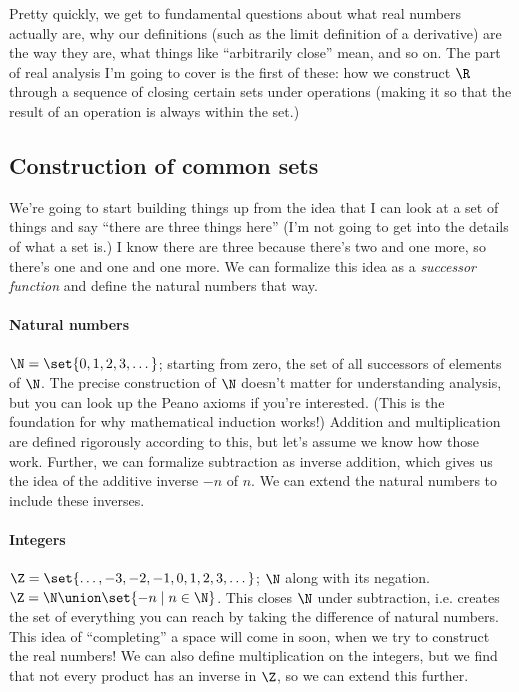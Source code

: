 \documentclass[./analysis.tex]{subfiles}
\begin{document}
    Pretty quickly, we get to fundamental questions about what real numbers actually are, why our definitions (such as the limit definition of a derivative) are the way they are, what things like ``arbitrarily close'' mean, and so on. The part of real analysis I'm going to cover is the first of these: how we construct $\R$ through a sequence of closing certain sets under operations (making it so that the result of an operation is always within the set.)

    \subsection{Construction of common sets}

    We're going to start building things up from the idea that I can look at a set of things and say ``there are three things here'' (I'm not going to get into the details of what a set is.) I know there are three because there's two and one more, so there's one and one and one more. We can formalize this idea as a \emph{successor function} and define the natural numbers that way.

    \paragraph*{Natural numbers} $\N = \set{0, 1, 2, 3, \dots}$; starting from zero, the set of all successors of elements of $\N$. The precise construction of $\N$ doesn't matter for understanding analysis, but you can look up the Peano axioms if you're interested. (This is the foundation for why mathematical induction works!) Addition and multiplication are defined rigorously according to this, but let's assume we know how those work. Further, we can formalize subtraction as inverse addition, which gives us the idea of the additive inverse $-n$ of $n$. We can extend the natural numbers to include these inverses.

    \paragraph*{Integers} $\Z = \set{\dots, -3, -2, -1, 0, 1, 2, 3, \dots}$; $\N$ along with its negation. $\Z = \N \union \set{-n \mid n \in \N}$. This closes $\N$ under subtraction, i.e. creates the set of everything you can reach by taking the difference of natural numbers. This idea of ``completing'' a space will come in soon, when we try to construct the real numbers! We can also define multiplication on the integers, but we find that not every product has an inverse in $\Z$, so we can extend this further.
\end{document}
